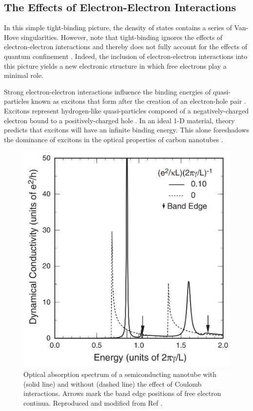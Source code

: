  
\subsection{The Effects of Electron-Electron Interactions}

In this simple tight-binding picture, the density of states contains a series of Van-Hove singularities. However, note that tight-binding ignores the effects of electron-electron interactions and thereby does not fully account for the effects of quantum confinement \cite{weismanKonoBook}. Indeed, the inclusion of electron-electron interactions into this picture yields a new electronic structure in which free electrons play a minimal role.

Strong electron-electron interactions influence the binding energies of quasi-particles known as excitons that form after the creation of an electron-hole pair \cite{koch2006semiconductor}. Excitons represent hydrogen-like quasi-particles composed of a negatively-charged electron bound to a positively-charged hole \cite{koch2006semiconductor}. In an ideal 1-D material, theory predicts that excitons will have an infinite binding energy. This alone foreshadows the dominance of excitons in the optical properties of carbon nanotubes \cite{ando2005theory}. 

\begin{figure}[h]
	\centering
	\includegraphics[scale=0.35]{images/chapter_optical_props/ando_suppression}
	\caption{Optical absorption spectrum of a semiconducting nanotube with (solid line) and without (dashed line) the effect of Coulomb interactions. Arrows mark the band edge positions of free electron continua. Reproduced and modified from Ref \cite{ando2005theory}.}
	\label{fig:ando_suppression}
\end{figure}

